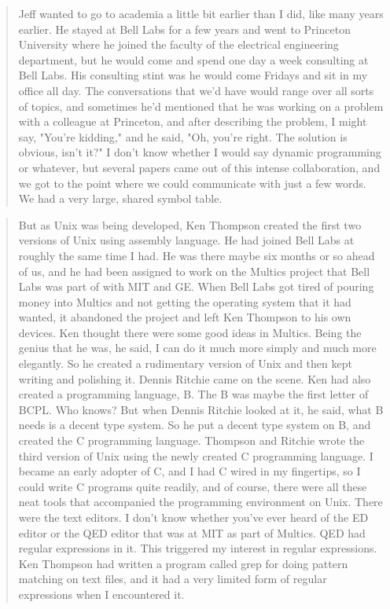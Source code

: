 \begin{quotation}
Jeff wanted to go to academia a little bit earlier than I did, like many years 
earlier. He stayed at Bell Labs for a few years and went to Princeton 
University where he joined the faculty of the electrical engineering 
department, but he would come and spend one day a week consulting at Bell Labs. 
His consulting stint was he would come Fridays and sit in my office all day. 
The conversations that we'd have would range over all sorts of topics, and 
sometimes he'd mentioned that he was working on a problem with a colleague at 
Princeton, and after describing the problem, I might say, "You're kidding," and 
he said, "Oh, you're right. The solution is obvious, isn't it?" I don't know 
whether I would say dynamic programming or whatever, but several papers came 
out of this intense collaboration, and we got to the point where we could 
communicate with just a few words. We had a very large, shared symbol table.
\cite{aho_oral_history_2022}
\end{quotation}

\begin{quotation}
But as Unix was being developed, Ken Thompson created the first two versions of
Unix using assembly language. He had joined Bell Labs at roughly the same time I had. He was there
maybe six months or so ahead of us, and he had been assigned to work on the Multics project that Bell
Labs was part of with MIT and GE. When Bell Labs got tired of pouring money into Multics and not getting
the operating system that it had wanted, it abandoned the project and left Ken Thompson to his own
devices. Ken thought there were some good ideas in Multics. Being the genius that he was, he said, I can
do it much more simply and much more elegantly. So he created a rudimentary version of Unix and then
kept writing and polishing it. Dennis Ritchie came on the scene. Ken had also created a programming
language, B. The B was maybe the first letter of BCPL. Who knows? But when Dennis Ritchie looked at
it, he said, what B needs is a decent type system. So he put a decent type system on B, and created the
C programming language. Thompson and Ritchie wrote the third version of Unix using the newly created
C programming language. I became an early adopter of C, and I had C wired in my fingertips, so I could
write C programs quite readily, and of course, there were all these neat tools that accompanied the
programming environment on Unix. There were the text editors. I don't know whether you've ever heard of
the ED editor or the QED editor that was at MIT as part of Multics. QED had regular expressions in it. This
triggered my interest in regular expressions. Ken Thompson had written a program called grep for doing
pattern matching on text files, and it had a very limited form of regular expressions when I encountered it.
\cite{aho_oral_history_2022}
\end{quotation}

